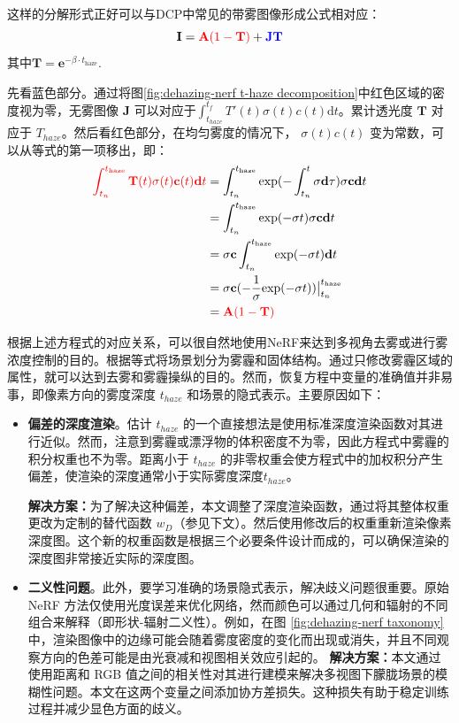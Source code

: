 这样的分解形式正好可以与DCP中常见的带雾图像形成公式相对应：
\begin{equation}
    \mathbf{I}= \textcolor{red}{\mathbf{A} (1-\mathbf{T})} + \textcolor{blue}{\mathbf{J} \mathbf{T}}
\end{equation}
其中$\mathbf{T}=\mathbf{e}^{-\beta \cdot t_\text{haze}}$.

先看蓝色部分。通过将图\ref{fig:dehazing-nerf t-haze decomposition}中红色区域的密度视为零，无雾图像 $\mathbf{J}$ 可以对应于$\int_{t_{haze}}^{t_f}T'(t)\sigma(t)c(t)\text{d}t$。累计透光度 $\mathbf{T}$ 对应于 ${T_{haze}}$。然后看红色部分，在均匀雾度的情况下， $σ(t)c(t)$ 变为常数，可以从等式的第一项移出，即：
\begin{align*}
    \textcolor{red}{\int_{t_n}^{{t}_\text{haze}}\mathbf{T}(t){{\sigma}}(t){\mathbf{c}}(t)\mathbf{d}t} &= \int_{t_n}^{t_\text{haze}} \text{exp}(-\int_{t_n}^t {\sigma}\mathbf{d}\tau) {\sigma}{\mathbf{c}}\mathbf{d}t \\
    &=\int_{t_n}^{t_\text{haze}} \text{exp}(-{\sigma}t) {\sigma}{\mathbf{c}}\mathbf{d}t \\
    &={\sigma}{\mathbf{c}}\int_{t_n}^{t_\text{haze}} \text{exp}(-{\sigma}t) \mathbf{d}t \\
    &={\sigma}{\mathbf{c}}(-\frac{1}{{\sigma}}\text{exp}(-{\sigma}t))\big|_{t_n}^{t_\text{haze}} \\
    &=\textcolor{red}{\mathbf{A}(1-\mathbf{T})}
\end{align*}

根据上述方程式的对应关系，可以很自然地使用NeRF来达到多视角去雾或进行雾浓度控制的目的。根据等式将场景划分为雾霾和固体结构。通过只修改雾霾区域的属性，就可以达到去雾和雾霾操纵的目的。然而，恢复方程中变量的准确值并非易事，即像素方向的雾度深度 $t_{haze}$ 和场景的隐式表示。主要原因如下：
\begin{itemize}
    \item \textbf{偏差的深度渲染}。估计 $t_{haze}$ 的一个直接想法是使用标准深度渲染函数对其进行近似。然而，注意到雾霾或漂浮物的体积密度不为零，因此方程式中雾霾的积分权重也不为零。距离小于 $t_{haze}$ 的非零权重会使方程式中的加权积分产生偏差，使渲染的深度通常小于实际雾度深度$t_{haze}$。
    
    \textbf{解决方案：}为了解决这种偏差，本文调整了深度渲染函数，通过将其整体权重更改为定制的替代函数 $w_D$（参见下文）。然后使用修改后的权重重新渲染像素深度图。这个新的权重函数是根据三个必要条件设计而成的，可以确保渲染的深度图非常接近实际的深度图。
    \item \textbf{二义性问题}。此外，要学习准确的场景隐式表示，解决歧义问题很重要。原始 NeRF 方法仅使用光度误差来优化网络，然而颜色可以通过几何和辐射的不同组合来解释（即形状-辐射二义性\cite{zhang_nerf_2020}）。例如，在图 \ref{fig:dehazing-nerf taxonomy}中，渲染图像中的边缘可能会随着雾度密度的变化而出现或消失，并且不同观察方向的色差可能是由光衰减和视图相关效应引起的。
    \textbf{解决方案：}本文通过使用距离和 RGB 值之间的相关性对其进行建模来解决多视图下朦胧场景的模糊性问题。本文在这两个变量之间添加协方差损失。这种损失有助于稳定训练过程并减少显色方面的歧义。
\end{itemize}

